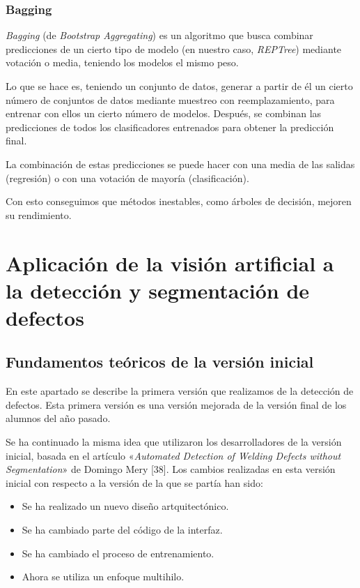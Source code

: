 \subsubsection{Bagging}
\textit{Bagging} (de \textit{Bootstrap Aggregating}) es un algoritmo que busca combinar predicciones de un cierto tipo de modelo (en nuestro caso, \textit{REPTree}) mediante votación o media, teniendo los modelos el mismo peso.

Lo que se hace es, teniendo un conjunto de datos, generar a partir de él un cierto número de conjuntos de datos mediante muestreo con reemplazamiento, para entrenar con ellos un cierto número de modelos. Después, se combinan las predicciones de todos los clasificadores entrenados para obtener la predicción final.

La combinación de estas predicciones se puede hacer con una media de las salidas (regresión) o con una votación de mayoría (clasificación).

Con esto conseguimos que métodos inestables, como árboles de decisión, mejoren su rendimiento.



\section{Aplicación de la visión artificial a la detección y segmentación de defectos}\label{aplicacion}


\subsection{Fundamentos teóricos de la versión inicial}
En este apartado se describe la primera versión que realizamos de la detección de defectos. Esta primera versión es una versión mejorada de la versión final de los alumnos del año pasado.

Se ha continuado la misma idea que utilizaron los desarrolladores de la versión inicial, basada en el artículo «\emph{Automated Detection of Welding Defects without Segmentation}» de Domingo Mery [38]. Los cambios realizadas en esta versión inicial con respecto a la versión de la que se partía han sido:
\begin{itemize}
\item Se ha realizado un nuevo diseño artquitectónico.
\item Se ha cambiado parte del código de la interfaz.
\item Se ha cambiado el proceso de entrenamiento.
\item Ahora se utiliza un enfoque multihilo.
\end{itemize}

